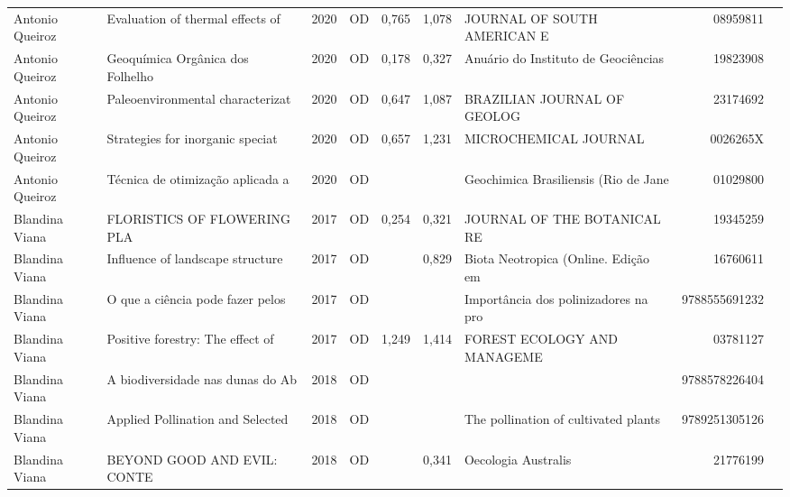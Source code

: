 \documentclass[12pt,brazil]{article}\usepackage[]{graphicx}\usepackage[]{xcolor}
\begin{document}
\begin{longtable}{lllrrllrr}
\rowcolor{coautr}\rowcolor{coautr}\rowcolor{coautr}\rowcolor{coautr}\rowcolor{coautr}\rowcolor{coautr}\rowcolor{coautr}\rowcolor{coautr}\rowcolor{coautr}\rowcolor{coautr}\rowcolor{coautr}\rowcolor{coautr}\rowcolor{coautr}\rowcolor{coautr}\rowcolor{coautr}\rowcolor{coautr}Antonio Queiroz & Evaluation of thermal effects of & 2020 & OD & 0,765 & 1,078 & JOURNAL OF SOUTH AMERICAN E & 08959811 \\
Antonio Queiroz & Geoquímica Orgânica dos Folhelho & 2020 & OD & 0,178 & 0,327 & Anuário do Instituto de Geociências  & 19823908 \\
\rowcolor{coautr}\rowcolor{coautr}\rowcolor{coautr}\rowcolor{coautr}\rowcolor{coautr}\rowcolor{coautr}\rowcolor{coautr}\rowcolor{coautr}\rowcolor{coautr}\rowcolor{coautr}\rowcolor{coautr}\rowcolor{coautr}\rowcolor{coautr}\rowcolor{coautr}\rowcolor{coautr}\rowcolor{coautr}Antonio Queiroz & Paleoenvironmental characterizat & 2020 & OD & 0,647 & 1,087 & BRAZILIAN JOURNAL OF GEOLOG & 23174692 \\
Antonio Queiroz & Strategies for inorganic speciat & 2020 & OD & 0,657 & 1,231 & MICROCHEMICAL JOURNAL & 0026265X \\
Antonio Queiroz & Técnica de otimização aplicada a & 2020 & OD &  &  & Geochimica Brasiliensis (Rio de Jane & 01029800 \\
\rowcolor{coautr}\rowcolor{coautr}\rowcolor{coautr}\rowcolor{coautr}\rowcolor{coautr}\rowcolor{coautr}\rowcolor{coautr}\rowcolor{coautr}\rowcolor{coautr}\rowcolor{coautr}\rowcolor{coautr}\rowcolor{coautr}\rowcolor{coautr}\rowcolor{coautr}\rowcolor{coautr}\rowcolor{coautr}Blandina Viana & FLORISTICS OF FLOWERING PLA & 2017 & OD & 0,254 & 0,321 & JOURNAL OF THE BOTANICAL RE & 19345259 \\
Blandina Viana & Influence of landscape structure & 2017 & OD &  & 0,829 & Biota Neotropica (Online. Edição em  & 16760611 \\
Blandina Viana & O que a ciência pode fazer pelos & 2017 & OD &  &  & Importância dos polinizadores na pro & 9788555691232 \\
Blandina Viana & Positive forestry: The effect of & 2017 & OD & 1,249 & 1,414 & FOREST ECOLOGY AND MANAGEME & 03781127 \\
Blandina Viana & A biodiversidade nas dunas do Ab & 2018 & OD &  &  &  & 9788578226404 \\
Blandina Viana & Applied Pollination and Selected & 2018 & OD &  &  & The pollination of cultivated plants & 9789251305126 \\
Blandina Viana & BEYOND GOOD AND EVIL: CONTE & 2018 & OD &  & 0,341 & Oecologia Australis & 21776199 \\

\end{longtable}
\end{document}
